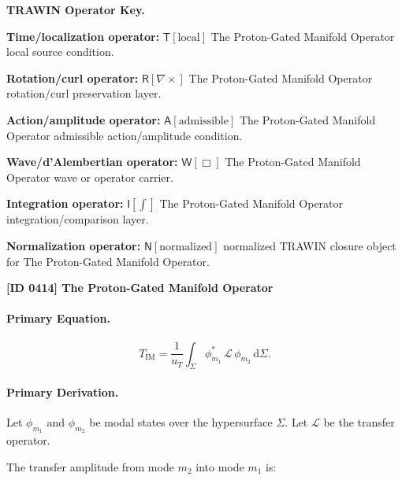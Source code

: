 \par\vspace{0.45\baselineskip}
\noindent\begin{minipage}[t]{\linewidth}
\begingroup
\small
\raggedright
\textbf{TRAWIN Operator Key.}\par
\noindent\textbf{Time/localization operator:} $\mathsf{T}\!\left[\mathrm{local}\right]$ The Proton-Gated Manifold Operator local source condition.\par
\noindent\textbf{Rotation/curl operator:} $\mathsf{R}\!\left[\nabla\times\right]$ The Proton-Gated Manifold Operator rotation/curl preservation layer.\par
\noindent\textbf{Action/amplitude operator:} $\mathsf{A}\!\left[\mathrm{admissible}\right]$ The Proton-Gated Manifold Operator admissible action/amplitude condition.\par
\noindent\textbf{Wave/d'Alembertian operator:} $\mathsf{W}\!\left[\Box\right]$ The Proton-Gated Manifold Operator wave or operator carrier.\par
\noindent\textbf{Integration operator:} $\mathsf{I}\!\left[\int\right]$ The Proton-Gated Manifold Operator integration/comparison layer.\par
\noindent\textbf{Normalization operator:} $\mathsf{N}\!\left[\mathrm{normalized}\right]$ normalized TRAWIN closure object for The Proton-Gated Manifold Operator.\par
\endgroup
\end{minipage}

\clearpage
\noindent\textbf{[ID 0414] The Proton-Gated Manifold Operator}\par
\vspace{0.35em}
\paragraph{Primary Equation.}
\begin{equation}
T_{\mathrm{IM}}
=
\frac{1}{u_T}
\int_{\Sigma}
\phi_{m_1}^{*}
\,\mathcal{L}\,
\phi_{m_2}
\,\mathrm{d}\Sigma .
\end{equation}

\paragraph{Primary Derivation.}
Let $\phi_{m_1}$ and $\phi_{m_2}$ be modal states over the hypersurface $\Sigma$.  
Let $\mathcal{L}$ be the transfer operator.

The transfer amplitude from mode $m_2$ into mode $m_1$ is:


